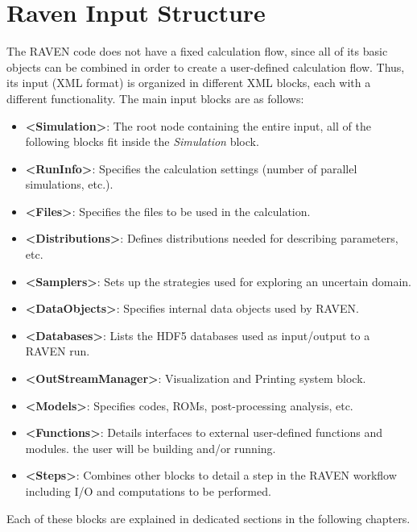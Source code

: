 \section{Raven Input Structure}
The RAVEN code does not have a fixed calculation flow, since all of its basic
objects can be combined in order to create a user-defined calculation flow.
%
Thus, its input (XML format) is organized in different XML blocks, each with a
different functionality.
%
The main input blocks are as follows:
\begin{itemize}
  \item \textbf{\textless Simulation\textgreater}: The root node containing the
  entire input, all of
  the following blocks fit inside the \emph{Simulation} block.
  \item \textbf{\textless RunInfo\textgreater}: Specifies the calculation
  settings (number of parallel simulations, etc.).
  \item \textbf{\textless Files\textgreater}: Specifies the files to be
  used in the calculation.
  \item \textbf{\textless Distributions\textgreater}: Defines distributions
  needed for describing parameters, etc.
  \item \textbf{\textless Samplers\textgreater}: Sets up the strategies used for
  exploring an uncertain domain.
  \item \textbf{\textless DataObjects\textgreater}: Specifies internal data objects
  used by RAVEN.
  \item \textbf{\textless Databases\textgreater}: Lists the HDF5 databases used
  as input/output to a
  RAVEN run.
  \item \textbf{\textless OutStreamManager\textgreater}: Visualization and
  Printing system block.
  \item \textbf{\textless Models\textgreater}: Specifies codes, ROMs,
  post-processing analysis, etc.
  \item \textbf{\textless Functions\textgreater}: Details interfaces to external
  user-defined functions and modules.
  the user will be building and/or running.
  \item \textbf{\textless Steps\textgreater}: Combines other blocks to detail a
  step in the RAVEN workflow including I/O and computations to be performed.
\end{itemize}

Each of these blocks are explained in dedicated sections in the following
chapters.
%

